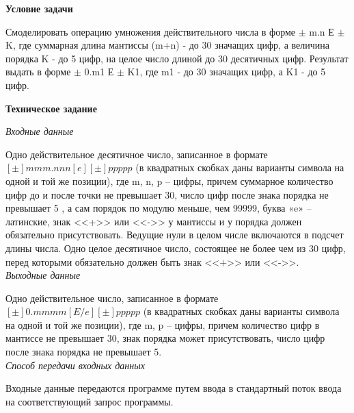 \documentclass[a4paper, 12pt, -shell-escape]{article}  %
\begin{document}
	
	\newpage
	\begin{center}
	\begin{large}
		\textbf{Условие задачи}\\
	\end{large}
	\end{center}

	Смоделировать операцию умножения действительного числа в форме $\pm$ m.n Е $\pm$ K, где суммарная длина мантиссы (m+n) - до 30 значащих цифр, а величина порядка K - до 5 цифр, на целое число длиной до 30 десятичных цифр. Результат выдать в форме $\pm$ 0.m1 Е $\pm$ K1, где m1 - до 30 значащих цифр, а K1 - до 5 цифр.\\
	
	\begin{center}
		\begin{large}
			\textbf{Техническое задание}\\
		\end{large}
	\end{center}

	\textit{Входные данные}

	Одно действительное десятичное число, записанное в формате $[\pm]mmm.nnn[e][\pm]ppppp$
	(в квадратных скобках даны варианты символа на одной и той же позиции), где m, n, p – цифры, причем суммарное количество цифр до и после точки не превышает 30, число цифр после знака порядка не превышает 5 , а сам порядок по модулю меньше, чем 99999, буква «e» – латинские, знак <<+>> или <<->> у мантиссы и у порядка должен обязательно присутствовать. Ведущие нули в целом числе включаются в подсчет длины числа.
	Одно целое десятичное число, состоящее не более чем из 30 цифр, перед которыми обязательно должен быть знак <<+>> или <<->>.\\
	
	\textit{Выходные данные}
	
	Одно действительное число, записанное в формате $[\pm]0.mmmm[E/e][\pm]ppppp$
	(в квадратных скобках даны варианты символа на одной и той же позиции), где m, p – цифры, причем количество цифр в мантиссе не превышает 30, знак порядка может присутствовать, число цифр после знака порядка не превышает 5.\\
	
	\textit{Способ передачи входных данных}
	
	Входные данные передаются программе путем ввода в стандартный поток ввода на соответствующий запрос программы.\\
	
\end{document}
